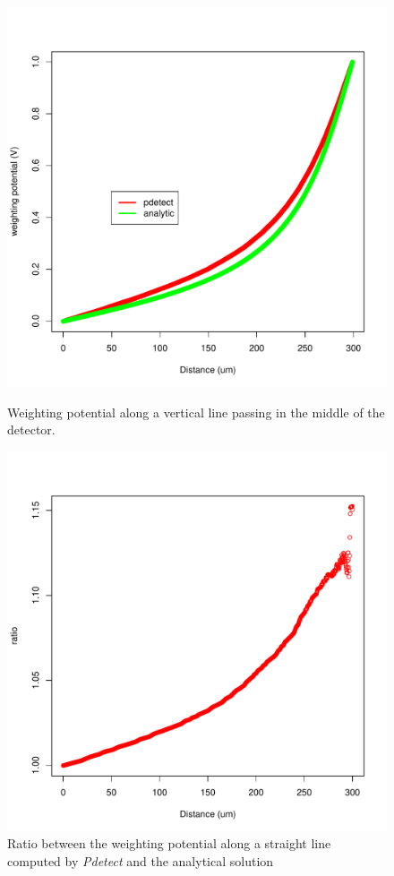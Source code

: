 \documentclass[11pt]{article}
\begin{document}
		\begin{figure}[H]
			\begin{minipage}[b]{.46\linewidth}
				\center
				\includegraphics[scale=0.45]{images/boundary_conditions/semi-free.pdf}
				\caption{Weighting potential along a vertical line passing in the middle of the detector.}
				\label{fig:semi_free_conditions}
			\end{minipage} \hfill
			\begin{minipage}[b]{.46\linewidth}
				\center
				\includegraphics[scale=0.45]{images/boundary_conditions/semi-free_ratio.pdf}
				\caption{Ratio between the weighting potential along a straight line
						computed by \textit{Pdetect} and the analytical solution}
				\label{fig:semi_free_ratio}
			\end{minipage}
		\end{figure}
\end{document}
